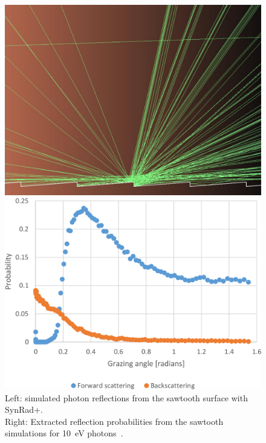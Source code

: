 \begin{figure}[tbh]
    \centering
    \begin{minipage}[t]{0.47\textwidth}
        \includegraphics[width=\textwidth]{../ss/synrad_plus_sawtooth.png}
    \end{minipage}
    \hspace{0.5cm}
    \begin{minipage}[t]{0.47\textwidth}
        \includegraphics[width=\textwidth]{../ss/synrad_plus_sawtooth_refl.png}
    \end{minipage}
    \caption{
        Left: simulated photon reflections from the sawtooth surface with SynRad+.
        \\
        Right: Extracted reflection probabilities from the sawtooth simulations for 10~eV photons~\cite{synrad+}.
    }
    \label{fig:synrad}
\end{figure}

